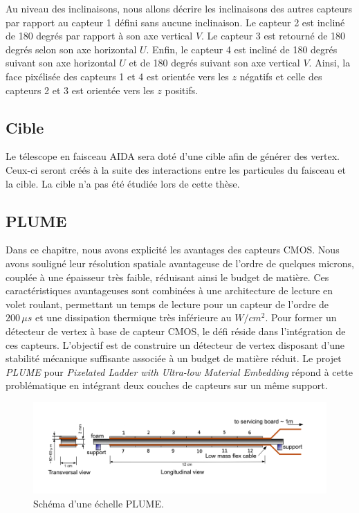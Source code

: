   \medskip
   
   Au niveau des inclinaisons, nous allons d\'ecrire les inclinaisons des autres capteurs par rapport au capteur 1 d\'efini sans aucune inclinaison. Le capteur 2 est inclin\'e de 180 degr\'es par rapport \`a son axe vertical $V$. Le capteur 3 est retourn\'e de 180 degr\'es selon son axe horizontal $U$. Enfin, le capteur 4 est inclin\'e de 180 degr\'es suivant son axe horizontal $U$ et de 180 degr\'es suivant son axe vertical $V$. Ainsi, la face pix\'elis\'ee des capteurs 1 et 4 est orient\'ee vers les $z$ n\'egatifs et celle des capteurs 2 et 3 est orient\'ee vers les $z$ positifs.
  
  \subsection{Cible}

  Le t\'elescope en faisceau AIDA sera dot\'e d'une cible afin de g\'en\'erer des vertex. Ceux-ci seront cr\'e\'es \`a la suite des interactions entre les particules du faisceau et la cible. La cible n'a pas \'et\'e \'etudi\'ee lors de cette th\`ese.
  
  \subsection{PLUME}

  Dans ce chapitre, nous avons explicit\'e les avantages des capteurs CMOS. Nous avons soulign\'e leur r\'esolution spatiale avantageuse de l'ordre de quelques microns, coupl\'ee \`a une \'epaisseur tr\`es faible, r\'eduisant ainsi le budget de mati\`ere. Ces caract\'eristiques avantageuses sont combin\'ees \`a une architecture de lecture en volet roulant, permettant un temps de lecture pour un capteur de l'ordre de $200  \, \mu s$ et une dissipation thermique tr\`es inf\'erieure au $W/cm^2$. Pour former un d\'etecteur de vertex \`a base de capteur CMOS, le d\'efi r\'eside dans l'int\'egration de ces capteurs. L'objectif est de construire un d\'etecteur de vertex disposant d'une stabilit\'e m\'ecanique suffisante associ\'ee \`a un budget de mati\`ere r\'eduit. Le projet \textit{PLUME} pour \textit{Pixelated Ladder with Ultra-low Material Embedding} r\'epond \`a cette probl\'ematique en int\'egrant deux couches de capteurs sur un m\^eme support.
  
  \medskip
  
   \begin{figure}[!htb]
    \begin{center} 
     \includegraphics[scale=0.50]{./figures/plume_schema.png}
     \caption{Schéma d'une \'echelle PLUME.}
     \label{fig:PLUME}
    \end{center}
  \end{figure}
  
